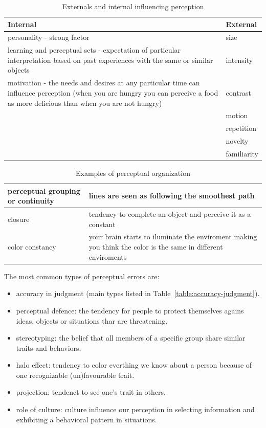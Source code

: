 \documentclass[12pt,article,oneside,a4paper]{memoir}
\begin{document}
\begin{table}
  \begin{tabular}{ p{13cm} |  p{2cm} }
    \hline
    Internal & External \\ \hline
    personality -  strong factor & size \\ \hline
    learning and perceptual sets - expectation of particular interpretation based
    on past experiences with the same or similar objects & intensity \\ \hline
    motivation - the needs and desires at any particular time can influence
    perception     (when you are hungry you can perceive a food as more delicious
    than when you are not hungry) & contrast \\ \hline
	 & motion \\ \hline
 	 & repetition \\ \hline
 	 & novelty \\ \hline
     & familiarity \\
    \hline
  \end{tabular}
  \caption{Externals and internal influencing perception}
  \label{table:factors-perception}
\end{table}

\begin{table}
  \begin{tabular}{ l |  p{10cm} }
    \hline
    perceptual grouping or continuity & lines are seen as following the
    smoothest path \\ \hline
    closure & tendency to complete an object and perceive it as a constant \\
    \hline
    color constancy & your brain starts to iluminate the enviroment making you
    think the color is the same in different enviroments \\
    \hline
  \end{tabular}
  \caption{Examples of perceptual organization}
  \label{table:perceptual-organization}
\end{table}

The most common types of perceptual errors are:
\begin{itemize}
\item accuracy in judgment (main types listed in Table~\ref{table:accuracy-judgment}).
\item perceptual defence: the tendency for people to protect themselves agains
ideas, objects or situations thar are threatening.
\item stereotyping: the belief that all members of a specific group share similar
traits and behaviors.
\item halo effect: tendency to color everthing we know about a person because
of one recognizable (un)favourable trait.
\item projection: tendenct to see one's trait in others.
\item role of culture: culture influence our perception in selecting information
and exhibiting a behavioral pattern in situations.
\end{itemize}
\end{document}
